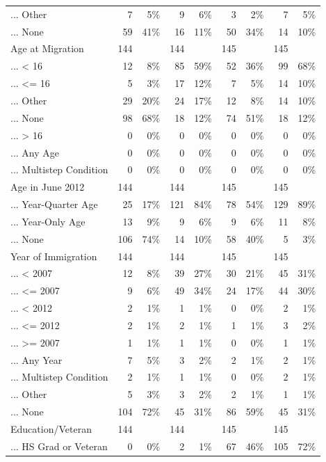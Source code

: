 \documentclass[
  letterpaper,
  DIV=11,
  numbers=noendperiod]{scrartcl}
\begin{document}
\begin{table}[!htbp]
{\begin{tabular}{lrrrrrrrr}
... Other & 7 & 5\% & 9 & 6\% & 3 & 2\% & 7 & 5\% \\ 
... None & 59 & 41\% & 16 & 11\% & 50 & 34\% & 14 & 10\% \\ 
Age at Migration & 144 &  & 144 &  & 145 &  & 145 &  \\ 
... < 16 & 12 & 8\% & 85 & 59\% & 52 & 36\% & 99 & 68\% \\ 
... <= 16 & 5 & 3\% & 17 & 12\% & 7 & 5\% & 14 & 10\% \\ 
... Other & 29 & 20\% & 24 & 17\% & 12 & 8\% & 14 & 10\% \\ 
... None & 98 & 68\% & 18 & 12\% & 74 & 51\% & 18 & 12\% \\ 
... > 16 & 0 & 0\% & 0 & 0\% & 0 & 0\% & 0 & 0\% \\ 
... Any Age & 0 & 0\% & 0 & 0\% & 0 & 0\% & 0 & 0\% \\ 
... Multistep Condition & 0 & 0\% & 0 & 0\% & 0 & 0\% & 0 & 0\% \\ 
Age in June 2012 & 144 &  & 144 &  & 145 &  & 145 &  \\ 
... Year-Quarter Age & 25 & 17\% & 121 & 84\% & 78 & 54\% & 129 & 89\% \\ 
... Year-Only Age & 13 & 9\% & 9 & 6\% & 9 & 6\% & 11 & 8\% \\ 
... None & 106 & 74\% & 14 & 10\% & 58 & 40\% & 5 & 3\% \\ 
Year of Immigration & 144 &  & 144 &  & 145 &  & 145 &  \\ 
... < 2007 & 12 & 8\% & 39 & 27\% & 30 & 21\% & 45 & 31\% \\ 
... <= 2007 & 9 & 6\% & 49 & 34\% & 24 & 17\% & 44 & 30\% \\ 
... < 2012 & 2 & 1\% & 1 & 1\% & 0 & 0\% & 2 & 1\% \\ 
... <= 2012 & 2 & 1\% & 2 & 1\% & 1 & 1\% & 3 & 2\% \\ 
... >= 2007 & 1 & 1\% & 1 & 1\% & 0 & 0\% & 1 & 1\% \\ 
... Any Year & 7 & 5\% & 3 & 2\% & 2 & 1\% & 2 & 1\% \\ 
... Multistep Condition & 2 & 1\% & 1 & 1\% & 0 & 0\% & 2 & 1\% \\ 
... Other & 5 & 3\% & 3 & 2\% & 2 & 1\% & 1 & 1\% \\ 
... None & 104 & 72\% & 45 & 31\% & 86 & 59\% & 45 & 31\% \\ 
Education/Veteran & 144 &  & 144 &  & 145 &  & 145 &  \\ 
... HS Grad or Veteran & 0 & 0\% & 2 & 1\% & 67 & 46\% & 105 & 72\% \\ 

\end{tabular}}
\end{table}
\end{document}
